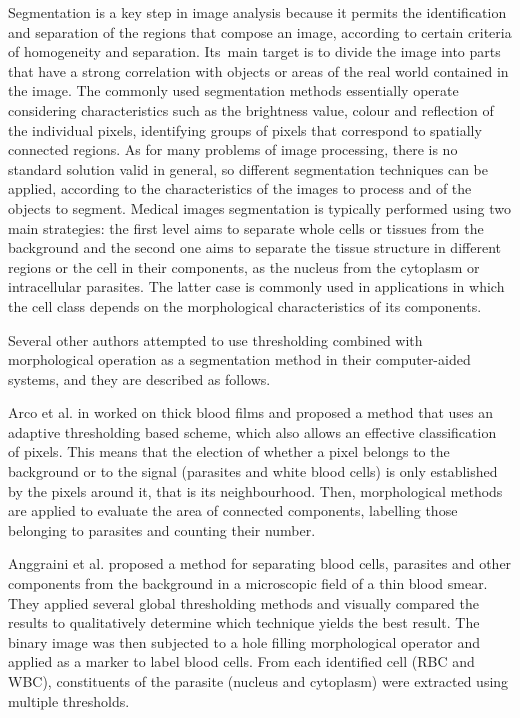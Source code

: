 \documentclass[final,a4paper,12pt,english]{UnicaPhdThesis3}
\begin{document}
	Segmentation is a key step in image analysis because it permits the identification and separation of the regions that compose an image, according to certain criteria of homogeneity and separation. Its~main target is to divide the image into parts that have a strong correlation with objects or areas of the real world contained in the image.
	The commonly used segmentation methods essentially operate considering characteristics such as the brightness value, colour and reflection of the individual pixels, identifying groups of pixels that correspond to spatially connected regions. As for many problems of image processing, there is no standard solution valid in general, so different segmentation techniques can be applied, according to the characteristics of the images to process and of the objects to segment.
	Medical images segmentation is typically performed using two main strategies: the first level aims to separate whole cells or tissues from the background and the second one aims to separate the tissue structure in different regions or the cell in their components, as the nucleus from the cytoplasm or intracellular parasites. The latter case is commonly used in applications in which the cell class depends on the morphological characteristics of its components.
	
	Several other authors attempted to use thresholding combined with morphological operation as a segmentation method in their computer-aided systems, and they are described as follows.
	
	Arco et al. in \cite{Arco2014} worked on thick blood films and proposed a method that uses an adaptive thresholding based scheme, which also allows an effective classification of pixels. This means that the election of whether a pixel belongs to the background or to the signal (parasites and white blood cells) is only established by the pixels around it, that is its neighbourhood. Then, morphological methods are applied to evaluate the area of connected components, labelling those belonging to parasites and counting their number.
	
	Anggraini et al. \cite{Anggraini2011} proposed a method for separating blood cells, parasites and other components from the background in a microscopic field of a thin blood smear. They applied several global thresholding methods and visually compared the results to qualitatively determine which technique yields the best result. The binary image was then subjected to a hole filling morphological operator and applied as a marker to label blood cells. From each identified cell (RBC and WBC), constituents of the parasite (nucleus and cytoplasm) were extracted using multiple thresholds.
	
\end{document}
